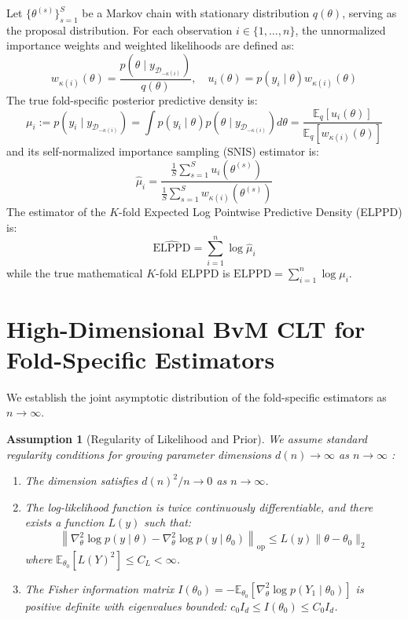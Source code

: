\documentclass[12pt]{article}
\newtheorem{assumption}{Assumption}
\begin{document}
Let $\{\theta^{(s)}\}_{s=1}^S$ be a Markov chain with stationary distribution $q(\theta)$, serving as the proposal distribution. For each observation $i \in \{1, \dots, n\}$, the unnormalized importance weights and weighted likelihoods are defined as:
\begin{equation}
w_{\kappa(i)}(\theta) = \frac{p(\theta \mid y_{\mathcal{D}_{-\kappa(i)}})}{q(\theta)}, \quad u_i(\theta) = p(y_i \mid \theta) w_{\kappa(i)}(\theta)
\end{equation}
The true fold-specific posterior predictive density is:
\begin{equation}
\mu_i := p(y_i \mid y_{\mathcal{D}_{-\kappa(i)}}) = \int p(y_i \mid \theta) p(\theta \mid y_{\mathcal{D}_{-\kappa(i)}}) d\theta = \frac{\mathbb{E}_q[u_i(\theta)]}{\mathbb{E}_q[w_{\kappa(i)}(\theta)]}
\end{equation}
and its self-normalized importance sampling (SNIS) estimator is:
\begin{equation}
\widehat{\mu}_i = \frac{\frac{1}{S}\sum_{s=1}^S u_i(\theta^{(s)})}{\frac{1}{S}\sum_{s=1}^S w_{\kappa(i)}(\theta^{(s)})}
\end{equation}
The estimator of the $K$-fold Expected Log Pointwise Predictive Density (ELPPD) is:
\begin{equation}
\widehat{\text{ELPPD}} = \sum_{i=1}^n \log \widehat{\mu}_i
\end{equation}
while the true mathematical $K$-fold ELPPD is $\text{ELPPD} = \sum_{i=1}^n \log \mu_i$.

\section{High-Dimensional BvM CLT for Fold-Specific Estimators}
We establish the joint asymptotic distribution of the fold-specific estimators as $n \to \infty$.

\begin{assumption}[Regularity of Likelihood and Prior]\label{ass:regularity}
We assume standard regularity conditions for growing parameter dimensions $d(n) \to \infty$ as $n \to \infty$ \cite{ghosal1999asymptotic, spokoiny2012parametric}:
\begin{enumerate}
    \item The dimension satisfies $d(n)^2 / n \to 0$ as $n \to \infty$.
    \item The log-likelihood function is twice continuously differentiable, and there exists a function $L(y)$ such that:
    \[
    \left\| \nabla^2_\theta \log p(y \mid \theta) - \nabla^2_\theta \log p(y \mid \theta_0) \right\|_{\text{op}} \leq L(y) \|\theta - \theta_0\|_2
    \]
    where $\mathbb{E}_{\theta_0}[L(Y)^2] \leq C_L < \infty$.
    \item The Fisher information matrix $I(\theta_0) = -\mathbb{E}_{\theta_0}[\nabla^2_\theta \log p(Y_1 \mid \theta_0)]$ is positive definite with eigenvalues bounded: $c_0 I_d \le I(\theta_0) \le C_0 I_d$.
\end{enumerate}
\end{assumption}
\end{document}
